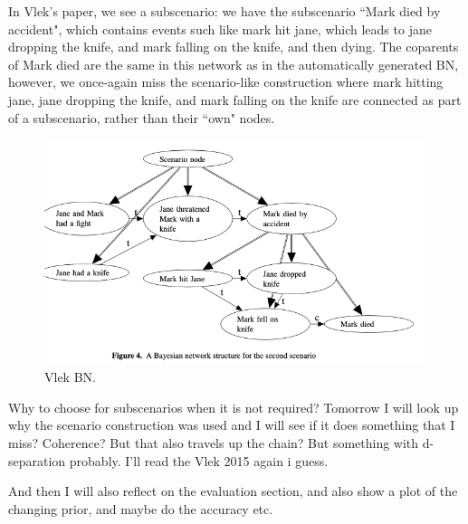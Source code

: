 In Vlek's paper, we see a subscenario: we have the subscenario ``Mark died by accident", which contains events such like mark hit jane, which leads to jane dropping the knife, and mark falling on the knife, and then dying. The coparents of Mark died are the same in this network as in the automatically generated BN, however, we once-again miss the scenario-like construction where mark hitting jane, jane dropping the knife, and mark falling on the knife are connected as part of a subscenario, rather than their ``own" nodes.

\begin{figure}[htbp]
\begin{center}
\includegraphics[width=\linewidth]{images/vlek2015.png}
\caption{Vlek BN.}
\label{vlek}
\end{center}
\end{figure}

Why to choose for subscenarios when it is not required? Tomorrow I will look up why the scenario construction was used and I will see if it does something that I miss? Coherence? But that also travels up the chain? But something with d-separation probably. I'll read the Vlek 2015 again i guess.

And then I will also reflect on the evaluation section, and also show a plot of the changing prior, and maybe do the accuracy etc.



